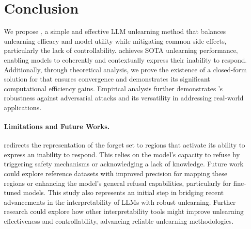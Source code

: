 \vspace{-2mm}
\section{Conclusion}
We propose \lunar, a simple and effective LLM unlearning method that balances unlearning efficacy and model utility while mitigating common side effects, particularly the lack of controllability. \lunar achieves SOTA unlearning performance, enabling models to coherently and contextually express their inability to respond. Additionally, through theoretical analysis, we prove the existence of a closed-form solution for \lunar that ensures convergence and demonstrates its significant computational efficiency gains. Empirical analysis further demonstrates \lunar's robustness against adversarial attacks and its versatility in addressing real-world applications.

\vspace{-2mm}
\paragraph{Limitations and Future Works.}
\lunar redirects the representation of the forget set to regions that activate its ability to express an inability to respond. This relies on the model’s capacity to refuse by triggering safety mechanisms or acknowledging a lack of knowledge. Future work could explore reference datasets with improved precision for mapping these regions or enhancing the model’s general refusal capabilities, particularly for fine-tuned models. This study also represents an initial step in bridging recent advancements in the interpretability of LLMs with robust unlearning. Further research could explore how other interpretability tools might improve unlearning effectiveness and controllability, advancing reliable unlearning methodologies.